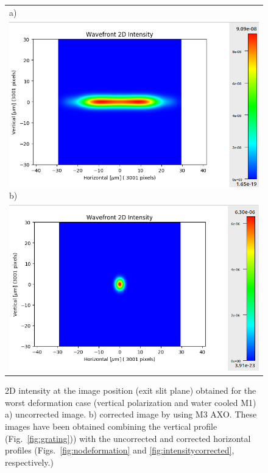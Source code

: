 \documentclass{iucr}              %
\begin{document}
  \begin{figure}
  \label{fig:intensity2D} 
  \begin{center}
  \begin{tabular}{l} 
  a)\\
  \includegraphics[width=1\textwidth]{figures/intensity2Duncorrected.png}
  b)\\
  \includegraphics[width=1\textwidth]{figures/intensity2Dcorrected.png}

  \end{tabular}
  \end{center}
  \caption
  { 
2D intensity at the image position (exit slit plane) obtained for the worst deformation case (vertical polarization and water cooled M1) a) uncorrected image. b) corrected image by using M3 AXO. These images have been obtained combining the vertical profile (Fig.~\ref{fig:grating})) with the uncorrected and corrected horizontal profiles (Figs.~\ref{fig:nodeformation} and \ref{fig:intensitycorrected}, respectively.)
}
  \end{figure}
  
\end{document}
